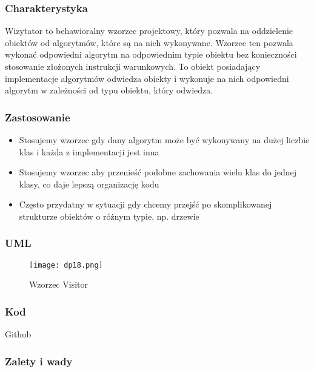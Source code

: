 \documentclass[a4paper,15pt]{article}
\begin{document}
\subsubsection{Charakterystyka}
Wizytator to behawioralny wzorzec projektowy, który pozwala na oddzielenie obiektów od algorytmów, które są na nich wykonywane. Wzorzec ten pozwala wykonać odpowiedni algorytm na odpowiednim typie obiektu bez konieczności stosowanie złożonych instrukcji warunkowych. To obiekt posiadający implementacje algorytmów odwiedza obiekty i wykonuje na nich odpowiedni algorytm w zależności od typu obiektu, który odwiedza. 


\subsubsection{Zastosowanie}
\begin{itemize}
\item Stosujemy wzorzec gdy dany algorytm może być wykonywany na dużej liczbie klas i każda z implementacji jest inna
\item Stosujemy wzorzec aby przenieść podobne zachowania wielu klas do jednej klasy, co daje lepszą organizację kodu
\item Często przydatny w sytuacji gdy chcemy przejść po skomplikowanej strukturze obiektów o różnym typie, np. drzewie
\end{itemize}

\subsubsection{UML}

\begin{figure}[H]
\centering
  \texttt{[image: dp18.png]}
  \caption{Wzorzec Visitor}
\end{figure}

\subsubsection{Kod}
Github

\subsubsection{Zalety i wady}
\end{document}
